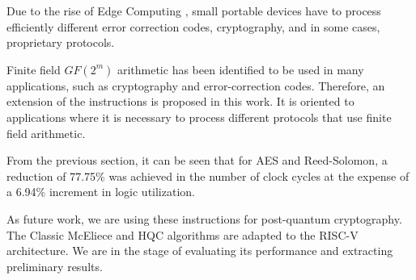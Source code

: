 Due to the rise of Edge Computing \cite{7488250}, small portable devices have to process 
efficiently different error correction codes, cryptography, 
and in some cases, proprietary protocols.

Finite field $GF(2^m)$ arithmetic has been identified to be used in many applications, such as cryptography and error-correction codes. Therefore, an extension of the instructions is proposed in this work. 
It is oriented to applications where it is necessary to process different protocols that use finite field arithmetic.

From the previous section, it can be seen that for AES and Reed-Solomon, a reduction of 77.75\% was achieved 
in the number of clock cycles at the expense of a 6.94\% increment in logic utilization.

As future work, we are using these instructions for post-quantum cryptography. The Classic McEliece and HQC algorithms are adapted to the RISC-V architecture. We are in the stage of evaluating its performance and extracting preliminary results.
